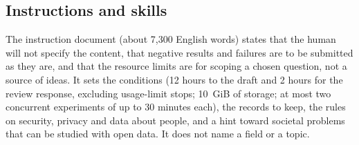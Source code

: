 \documentclass[11pt]{article}
\begin{document}
\subsection{Instructions and skills}
The instruction document (about 7,300 English words) states that the human will not specify the content, that negative results and failures are to be submitted as they are, and that the resource limits are for scoping a chosen question, not a source of ideas. It sets the conditions (12 hours to the draft and 2 hours for the review response, excluding usage-limit stops; 10~GiB of storage; at most two concurrent experiments of up to 30 minutes each), the records to keep, the rules on security, privacy and data about people, and a hint toward societal problems that can be studied with open data. It does not name a field or a topic.
\end{document}
